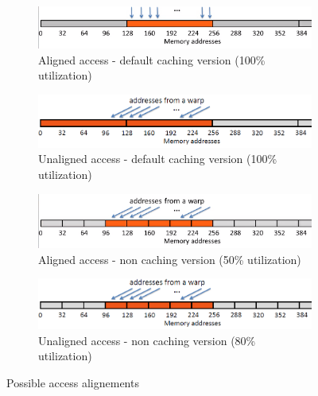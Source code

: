 \documentclass[a4paper]{article}
\begin{document}
\begin{figure}[!ht]
\begin{subfigure}{0.5\textwidth}
\centering
\includegraphics[width=\linewidth]{caching}
\caption{Aligned access - default caching version (100\% utilization)}
\label{fig:ca}
\end{subfigure}
\begin{subfigure}{0.5\textwidth}
\centering
\includegraphics[width=\linewidth]{caching2}
\caption{Unaligned access - default caching version (100\% utilization)}
\label{fig:uca}
\end{subfigure}
\begin{subfigure}{0.5\textwidth}
\centering
\includegraphics[width=\linewidth]{non_caching}
\caption{Aligned access - non caching version (50\% utilization)}
\label{fig:ca2}
\end{subfigure}
\begin{subfigure}{0.5\textwidth}
\centering
\includegraphics[width=\linewidth]{non_caching2}
\caption{Unaligned access - non caching version (80\% utilization)}
\label{fig:uca2}
\end{subfigure}
\caption{Possible access alignements}
 \label{fig:ucca}
\end{figure}
\FloatBarrier
\end{document}
